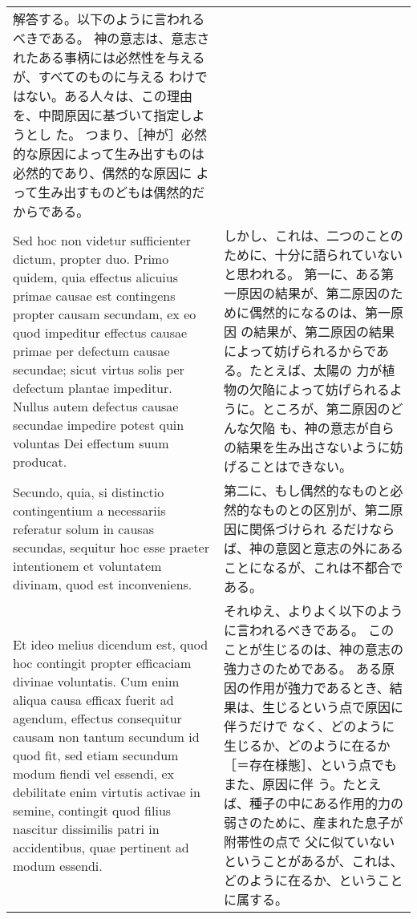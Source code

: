 \documentclass[10pt]{jsarticle} %
\begin{document}
\begin{longtable}{p{21em}p{21em}}
解答する。以下のように言われるべきである。
神の意志は、意志されたある事柄には必然性を与えるが、すべてのものに与える
 わけではない。ある人々は、この理由を、中間原因に基づいて指定しようとし
 た。
つまり、［神が］必然的な原因によって生み出すものは必然的であり、偶然的な原因に
 よって生み出すものどもは偶然的だからである。


\\



Sed hoc non videtur
sufficienter dictum, propter duo. Primo quidem, quia effectus alicuius
primae causae est contingens propter causam secundam, ex eo quod
impeditur effectus causae primae per defectum causae secundae; sicut
virtus solis per defectum plantae impeditur. Nullus autem defectus
causae secundae impedire potest quin voluntas Dei effectum suum
producat. 

&


しかし、これは、二つのことのために、十分に語られていないと思われる。
第一に、ある第一原因の結果が、第二原因のために偶然的になるのは、第一原因
 の結果が、第二原因の結果によって妨げられるからである。たとえば、太陽の
 力が植物の欠陥によって妨げられるように。ところが、第二原因のどんな欠陥
 も、神の意志が自らの結果を生み出さないように妨げることはできない。

\\



Secundo, quia, si distinctio contingentium a necessariis
referatur solum in causas secundas, sequitur hoc esse praeter
intentionem et voluntatem divinam, quod est inconveniens. 

&


第二に、もし偶然的なものと必然的なものとの区別が、第二原因に関係づけられ
 るだけならば、神の意図と意志の外にあることになるが、これは不都合である。

\\




Et ideo melius
dicendum est, quod hoc contingit propter efficaciam divinae
voluntatis. Cum enim aliqua causa efficax fuerit ad agendum, effectus
consequitur causam non tantum secundum id quod fit, sed etiam secundum
modum fiendi vel essendi, ex debilitate enim virtutis activae in semine,
contingit quod filius nascitur dissimilis patri in accidentibus, quae
pertinent ad modum essendi. 

&

それゆえ、よりよく以下のように言われるべきである。
このことが生じるのは、神の意志の強力さのためである。
ある原因の作用が強力であるとき、結果は、生じるという点で原因に伴うだけで
 なく、どのように生じるか、どのように在るか［＝存在様態］、という点でもまた、原因に伴
 う。たとえば、種子の中にある作用的力の弱さのために、産まれた息子が附帯性の点で
 父に似ていないということがあるが、これは、どのように在るか、ということ
 に属する。



\end{longtable}
\end{document}
